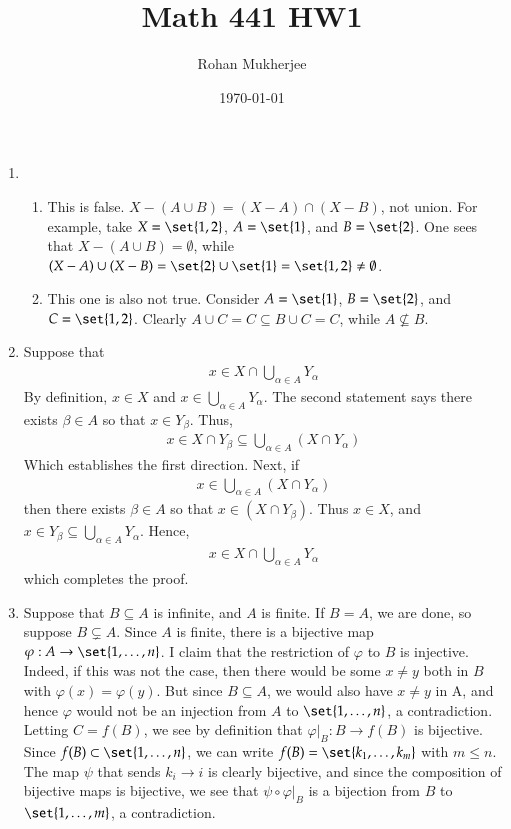 \documentclass[12pt]{article}
\title{Math 441 HW1}
\date{\today}
\author{Rohan Mukherjee}
\theoremstyle{definitionstyle}
\def \cph{\varphi}
\begin{document}
	\maketitle
	\begin{enumerate}[leftmargin=\labelsep]
		\item \begin{enumerate}
			\item This is false. $X - (A \cup B) = (X - A) \cap (X - B)$, not union. For example, take $X = \set{1, 2}$, $A = \set{1}$, and $B = \set{2}$. One sees that $X - (A \cup B) = \emptyset$, while $(X - A) \cup (X - B) = \set{2} \cup \set{1} = \set{1, 2} \neq \emptyset$.
			\item This one is also not true. Consider $A = \set{1}$, $B = \set{2}$, and $C = \set{1, 2}$. Clearly $A \cup C = C \subseteq B \cup C = C$, while $A \not \subseteq B$.
		\end{enumerate}
	
		\item Suppose that \begin{align*}
			x \in X \cap \bigcup_{\alpha \in A} Y_\alpha
		\end{align*}
		By definition, $x \in X$ and $x \in \bigcup_{\alpha \in A} Y_\alpha$. The second statement says there exists $\beta \in A$ so that $x \in Y_\beta$. Thus, \begin{align*}
			x \in X \cap Y_\beta \subseteq \bigcup_{\alpha \in A} (X \cap Y_\alpha)
		\end{align*}
		Which establishes the first direction. Next, if 
		\begin{align*}
			x \in \bigcup_{\alpha \in A} (X \cap Y_\alpha)
		\end{align*}
		then there exists $\beta \in A$ so that $x \in (X \cap Y_\beta)$. Thus $x \in X$, and $x \in Y_\beta \subseteq \bigcup_{\alpha \in A} Y_\alpha$. Hence,
		\begin{align*}
			x \in X \cap \bigcup_{\alpha \in A} Y_\alpha
		\end{align*}
		which completes the proof.
		
		\item Suppose that $B \subseteq A$ is infinite, and $A$ is finite. If $B = A$, we are done, so suppose $B \subsetneq A$. Since $A$ is finite, there is a bijective map $\cph: A \to \set{1, \ldots, n}$. I claim that the restriction of $\cph$ to $B$ is injective. Indeed, if this was not the case, then there would be some $x \neq y$ both in $B$ with $\cph(x) = \cph(y)$. But since $B \subseteq A$, we would also have $x \neq y$ in A, and hence $\cph$ would not be an injection from $A$ to $\set{1, \ldots, n}$, a contradiction. Letting $C = f(B)$, we see by definition that $\cph|_B: B \to f(B)$ is bijective. Since $f(B) \subset \set{1, \ldots, n}$, we can write $f(B) = \set{k_1, \ldots, k_m}$ with $m \leq n$. The map $\psi$ that sends $k_i \to i$ is clearly bijective, and since the composition of bijective maps is bijective, we see that $\psi \circ \cph|_B$ is a bijection from $B$ to $\set{1, \ldots, m}$, a contradiction. 
		

\end{enumerate}
\end{document}
